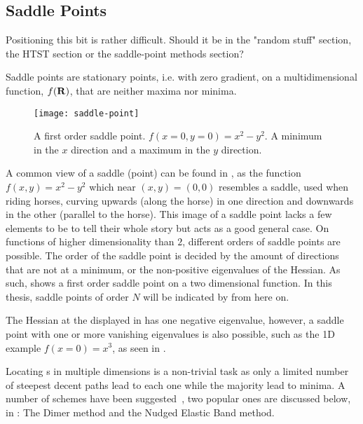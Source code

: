 \subsection{Saddle Points }
\label{sec:sps}

\bit
\item Positioning this bit is rather difficult. Should it be in the "random stuff" section, the HTST section or the saddle-point methods section?
\eit

Saddle points are stationary points, i.e. with zero gradient, on a multidimensional function, $f({\mathrm{\mathbf{\bm{R}}}})$, that are neither maxima nor minima.

\begin{figure}[h]
  \begin{center}
    \texttt{[image: saddle-point]}
    \parbox{0.85\linewidth}{
      \caption{A first order saddle point.
      $f(x=0, y=0) = x^2 - y^2$. A minimum in the $x$ direction and a maximum in the $y$ direction.
      }
      \label{fig:2d-saddle-point}
    }
  \end{center}
\end{figure}

A common view of a saddle (point) can be found in , as the function $f(x, y) = x^2 - y^2$ which near $(x,y) = (0,0)$ resembles a saddle, used when riding horses, curving upwards (along the horse) in one direction and downwards in the other (parallel to the horse).
This image of a saddle point lacks a few elements to be to tell their whole story but acts as a good general case.
On functions of higher dimensionality than $2$, different orders of saddle points are possible.
The order of the saddle point is decided by the amount of directions that are not at a minimum, or the non-positive eigenvalues of the Hessian.
As such,  shows a first order saddle point on a two dimensional function.
In this thesis, saddle points of order $N$ will be indicated by  from here on.

The Hessian at the \sap{} displayed in  has one negative eigenvalue, however, a saddle point with one or more vanishing eigenvalues is also possible, such as the 1D example $f(x = 0) = x^3$, as seen in .

Locating \sap{}s in multiple dimensions is a non-trivial task as only a limited number of steepest decent paths lead to each one while the majority lead to minima.
A number of schemes have been suggested~\citemiss, two popular ones are discussed below, in : The Dimer method and the Nudged Elastic Band method.

